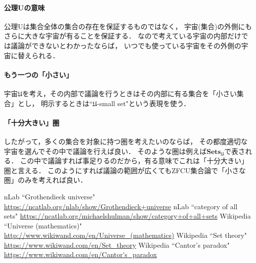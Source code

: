 \documentclass[a4j]{jarticle}
\theoremstyle{definition}
\begin{document}
            \paragraph{公理Uの意味}
                公理Uは集合全体の集合の存在を保証するものではなく，
                宇宙(集合)の外側にもさらに大きな宇宙が有ることを保証する．
                なので考えている宇宙の内部だけでは議論ができないとわかったならば，
                いつでも使っている宇宙をその外側の宇宙に替えられる．

            \paragraph{もう一つの「小さい」}
                宇宙$\mathfrak{U}$を考え，その内部で議論を行うときはその内部に有る集合を「小さい集合」とし，
                明示するときは``$\mathfrak{U}$-small set"という表現を使う．

            \paragraph{「十分大きい」圏}
                したがって，多くの集合を対象に持つ圏を考えたいのならば，
                その都度適切な宇宙を選んでその中で議論を行えば良い．
                そのような圏は例えば$\mathbf{Sets}_{\mathfrak{U}}$で表される．
                この中で議論すれば事足りるのだから，有る意味でこれは「十分大きい」圏と言える．
                このようにすれば議論の範囲が広くてもZFCU集合論で「小さな圏」のみを考えれば良い．

    \begin{thebibliography}{99}
         nLab ``Grothendieck universe" \url{https://ncatlab.org/nlab/show/Grothendieck+universe}
         nLab ``category of all sets" \url{https://ncatlab.org/michaelshulman/show/category+of+all+sets}
         Wikipedia ``Universe (mathematics)" \url{http://www.wikiwand.com/en/Universe_(mathematics)}
         Wikipedia ``Set theory" \url{https://www.wikiwand.com/en/Set_theory}
         Wikipedia ``Cantor's paradox" \url{https://www.wikiwand.com/en/Cantor's_paradox}
    \end{thebibliography}
\end{document}
